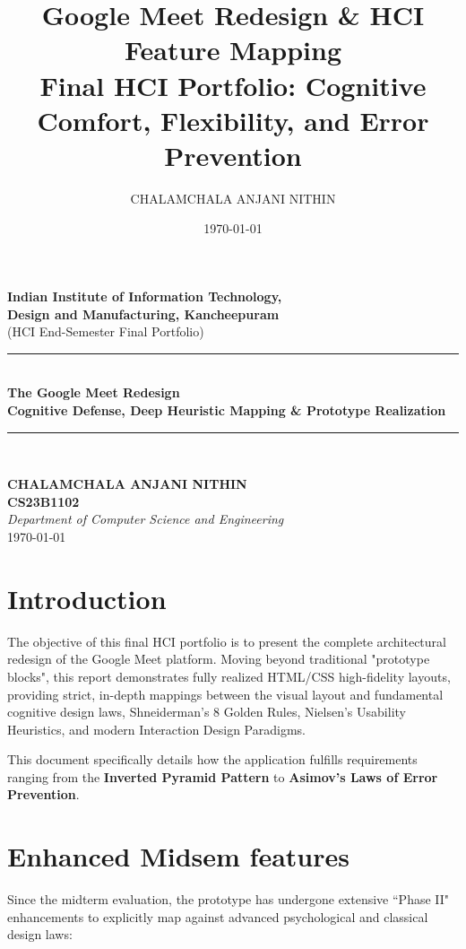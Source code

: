 \documentclass[12pt,a4paper]{article}
\title{\textbf{Google Meet Redesign \& HCI Feature Mapping}\\
\large Final HCI Portfolio: Cognitive Comfort, Flexibility, and Error Prevention}
\author{CHALAMCHALA ANJANI NITHIN}
\date{\today}
\begin{document}
\begin{titlepage}
\begin{center}

{\LARGE \textbf{Indian Institute of Information Technology,\\
Design and Manufacturing, Kancheepuram}}\\[1.5cm]

{\large (HCI End-Semester Final Portfolio)}\\[3cm]

\rule{\linewidth}{0.5pt}\\[0.4cm]
{\Huge \textbf{The Google Meet Redesign}}\\[0.3cm]
{\Large \textbf{Cognitive Defense, Deep Heuristic Mapping \& Prototype Realization}}\\[0.3cm]
\rule{\linewidth}{0.5pt}\\[2cm]

\vfill

\textbf{CHALAMCHALA ANJANI NITHIN}\\[0.2cm]
\textbf{CS23B1102}\\[0.2cm]
\textit{Department of Computer Science and Engineering}\\[0.5cm]

{\large \today}

\end{center}
\end{titlepage}

\newpage
\tableofcontents
\newpage

\section{Introduction}

The objective of this final HCI portfolio is to present the complete architectural redesign of the Google Meet platform. Moving beyond traditional "prototype blocks", this report demonstrates fully realized HTML/CSS high-fidelity layouts, providing strict, in-depth mappings between the visual layout and fundamental cognitive design laws, Shneiderman's 8 Golden Rules, Nielsen's Usability Heuristics, and modern Interaction Design Paradigms.

This document specifically details how the application fulfills requirements ranging from the \textbf{Inverted Pyramid Pattern} to \textbf{Asimov's Laws of Error Prevention}.

\section{Enhanced Midsem features}
Since the midterm evaluation, the prototype has undergone extensive ``Phase II" enhancements to explicitly map against advanced psychological and classical design laws:
\end{document}
